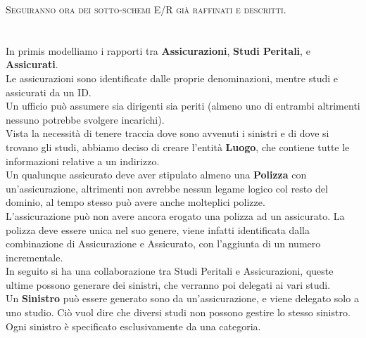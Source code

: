 \documentclass[a4paper,12pt]{report}
\begin{document}
\textsc{Seguiranno ora dei sotto-schemi E/R già raffinati e descritti.}
\\
\\
\\
In primis modelliamo i rapporti tra \textbf{Assicurazioni}, \textbf{Studi Peritali}, e \textbf{Assicurati}.
\\
Le assicurazioni sono identificate dalle proprie denominazioni, mentre studi e assicurati da un ID.
\\
Un ufficio può assumere sia dirigenti sia periti (almeno uno di 
entrambi altrimenti nessuno potrebbe svolgere incarichi).
\\
Vista la necessità di tenere traccia dove sono avvenuti i sinistri e di dove si trovano gli studi, abbiamo deciso di creare l’entità \textbf{Luogo}, che contiene tutte le informazioni relative a un indirizzo.
\\
Un qualunque assicurato deve aver stipulato almeno una \textbf{Polizza} con un’assicurazione, altrimenti non avrebbe nessun legame logico col resto del dominio, al tempo stesso può avere anche molteplici polizze.
\\
L’assicurazione può non avere ancora erogato una polizza ad un assicurato. La polizza deve essere unica nel suo genere, viene infatti identificata dalla combinazione di Assicurazione e Assicurato, con l’aggiunta di un numero incrementale.
\\
In seguito si ha una collaborazione tra Studi Peritali e Assicurazioni, queste ultime possono generare dei sinistri, che verranno poi delegati ai vari studi.
\\
Un \textbf{Sinistro} può essere generato sono da un'assicurazione, e viene delegato solo a uno studio. Ciò vuol dire che diversi studi non possono gestire lo stesso sinistro.
Ogni sinistro è specificato esclusivamente da una categoria.
\end{document}
